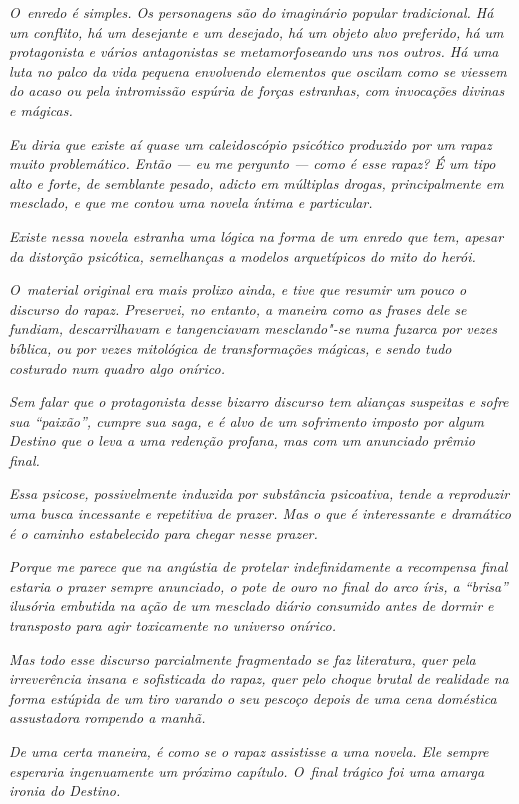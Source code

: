 \emph{O~enredo é simples. Os personagens são do imaginário popular
tradicional. Há um conflito, há um desejante e um desejado, há um objeto
alvo preferido, há um protagonista e vários antagonistas se
metamorfoseando uns nos outros. Há uma luta no palco da vida pequena
envolvendo elementos que oscilam como se viessem do acaso ou pela
intromissão espúria de forças estranhas, com invocações divinas e
mágicas.}~

\emph{Eu diria que existe aí quase um caleidoscópio psicótico produzido
por um rapaz muito problemático. Então --- eu me pergunto --- como é
esse rapaz? É um tipo alto e forte, de semblante pesado, adicto em
múltiplas drogas, principalmente em mesclado, e que me contou uma novela
íntima e particular.}~

\emph{Existe nessa novela estranha uma lógica na forma de um enredo que
tem, apesar da distorção psicótica, semelhanças a modelos arquetípicos
do mito do herói.}~

\emph{O~material original era mais prolixo ainda, e tive que resumir um
pouco o discurso do rapaz. Preservei, no entanto, a maneira como as
frases dele se fundiam, descarrilhavam e tangenciavam mesclando"-se numa
fuzarca por vezes bíblica, ou por vezes mitológica de transformações
mágicas, e sendo tudo costurado num quadro algo onírico.}~

\emph{Sem falar que o protagonista desse bizarro discurso tem alianças
suspeitas e sofre sua ``paixão'', cumpre sua saga, e é alvo de um
sofrimento imposto por algum Destino que o leva a uma redenção profana,
mas com um anunciado prêmio final.}~

\emph{Essa psicose, possivelmente induzida por substância psicoativa,
tende a reproduzir uma busca incessante e repetitiva de prazer. Mas o
que é interessante e dramático é o caminho estabelecido para chegar
nesse prazer.}~

\emph{Porque me parece que na angústia de protelar indefinidamente a
recompensa final estaria o prazer sempre anunciado, o pote de ouro no
final do arco íris, a ``brisa'' ilusória embutida na ação de um mesclado
diário consumido antes de dormir e transposto para agir toxicamente no
universo onírico.}~

\emph{Mas todo esse discurso parcialmente fragmentado se faz literatura,
quer pela irreverência insana e sofisticada do rapaz, quer pelo choque
brutal de realidade na forma estúpida de um tiro varando o seu pescoço
depois de uma cena doméstica assustadora rompendo a manhã.}~

\emph{De uma certa maneira, é como se o rapaz assistisse a uma novela.
Ele sempre esperaria ingenuamente um próximo capítulo. O~final trágico
foi uma amarga ironia do Destino.}

